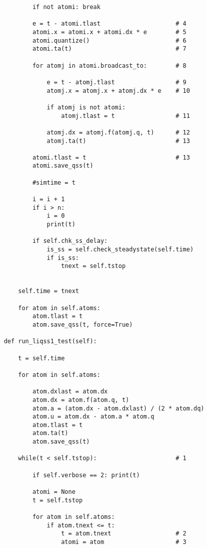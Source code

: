\begin{lstlisting}
            if not atomi: break

            e = t - atomi.tlast                     # 4
            atomi.x = atomi.x + atomi.dx * e        # 5
            atomi.quantize()                        # 6
            atomi.ta(t)                             # 7

            for atomj in atomi.broadcast_to:        # 8

                e = t - atomj.tlast                 # 9
                atomj.x = atomj.x + atomj.dx * e    # 10

                if atomj is not atomi:
                    atomj.tlast = t                 # 11

                atomj.dx = atomj.f(atomj.q, t)      # 12
                atomj.ta(t)                         # 13

            atomi.tlast = t                         # 13
            atomi.save_qss(t)
            
            #simtime = t

            i = i + 1
            if i > n:
                i = 0
                print(t)

            if self.chk_ss_delay:
                is_ss = self.check_steadystate(self.time)
                if is_ss:
                    tnext = self.tstop


        self.time = tnext

        for atom in self.atoms:
            atom.tlast = t
            atom.save_qss(t, force=True)

    def run_liqss1_test(self):

        t = self.time

        for atom in self.atoms:

            atom.dxlast = atom.dx
            atom.dx = atom.f(atom.q, t)
            atom.a = (atom.dx - atom.dxlast) / (2 * atom.dq)
            atom.u = atom.dx - atom.a * atom.q
            atom.tlast = t
            atom.ta(t)
            atom.save_qss(t)

        while(t < self.tstop):                      # 1

            if self.verbose == 2: print(t)

            atomi = None
            t = self.tstop

            for atom in self.atoms:
                if atom.tnext <= t:
                    t = atom.tnext                  # 2
                    atomi = atom                    # 3


\end{lstlisting}
